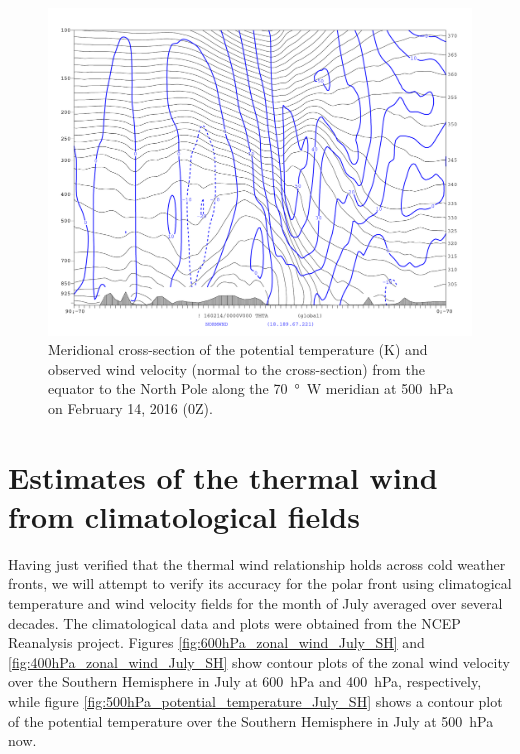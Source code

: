 \documentclass[11pt]{article}
\begin{document}
\begin{figure}[h!]
	\centering
	\includegraphics[width=\textwidth]{thta_normwnd_0-90N_70W}
	\caption{Meridional cross-section of the potential temperature (K) and observed wind velocity (normal to the cross-section) from the equator to the North Pole along the \SI{70}{\degree W} meridian at \SI{500}{\hecto\Pa} on February 14, 2016 (0Z).}
	\label{fig:thta_normwnd_xsec}
\end{figure}

\section{Estimates of the thermal wind from climatological fields}

Having just verified that the thermal wind relationship holds across cold weather fronts, we will attempt to verify its accuracy for the polar front using climatogical temperature and wind velocity fields for the month of July averaged over several decades. The climatological data and plots were obtained from the NCEP Reanalysis project. Figures \ref{fig:600hPa_zonal_wind_July_SH} and \ref{fig:400hPa_zonal_wind_July_SH} show contour plots of the zonal wind velocity over the Southern Hemisphere in July at \SI{600}{\hecto\Pa} and \SI{400}{\hecto\Pa}, respectively, while figure \ref{fig:500hPa_potential_temperature_July_SH} shows a contour plot of the potential temperature over the Southern Hemisphere in July at \SI{500}{\hecto\Pa} now.
\end{document}
